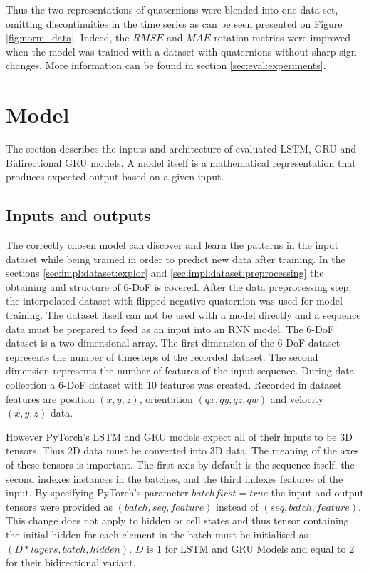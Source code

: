 Thus the two representations of quaternions were blended into one data set, omitting discontinuities in the time series as can be seen presented on Figure \ref{fig:norm_data}. Indeed, the $RMSE$ and $MAE$ rotation metrics were improved when the model was trained with a dataset with quaternions without sharp sign changes. More information can be found in section \ref{sec:eval:experiments}.


\newpage
\section{Model}
\label{sec:impl:model}
The section describes the inputs and architecture of evaluated LSTM, GRU and Bidirectional GRU models. A model itself is a mathematical representation that produces expected output based on a given input. 
\subsection{Inputs and outputs}
\label{sec:impl:model:inputs}
The correctly chosen model can discover and learn the patterns in the input dataset while being trained in order to predict new data after training. In the sections \ref{sec:impl:dataset:explor} and \ref{sec:impl:dataset:preprocessing} the obtaining and structure of 6-DoF is covered. After the data preprocessing step, the interpolated dataset with flipped negative quaternion was used for model training. The dataset itself can not be used with a model directly and a sequence data must be prepared to feed as an input into an RNN model. The 6-DoF dataset is a two-dimensional array. The first dimension of the 6-DoF dataset represents the number of timesteps of the recorded dataset. The second dimension represents the number of features of the input sequence. During data collection a 6-DoF dataset with 10 features was created. Recorded in dataset features are position $(x, y, z)$, orientation $(qx, qy, qz, qw)$ and velocity $(x, y, z)$ data. 

However PyTorch’s LSTM and GRU models expect all of their inputs to be 3D tensors. Thus 2D data must be converted into 3D data. The meaning of the axes of these tensors is important. The first axis by default is the sequence itself, the second indexes instances in the batches, and the third indexes features of the input. By specifying PyTorch's parameter $batch first = true$ the input and output tensors were provided as $(batch, seq, feature)$ instead of $(seq, batch, feature)$. This change does not apply to hidden or cell states and thus tensor containing the initial hidden for each element in the batch must be initialised as $(D * layers, batch, hidden)$. $D$ is 1 for LSTM and GRU Models and equal to 2 for their bidirectional variant. 

